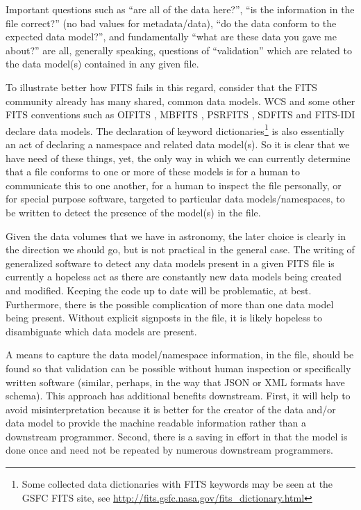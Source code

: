 \documentclass[final,authoryear,5p,times,twocolumn]{elsarticle}
\begin{document}
Important questions such as ``are all of the data here?'', ``is the
information in the file correct?'' (no bad values for metadata/data),
``do the data conform to the expected data model?'', and fundamentally
``what are these data you gave me about?'' are all, generally speaking,
questions of ``validation'' which are related to the data model(s)
contained in any given file.


To illustrate better how FITS fails in this regard, consider that the
FITS community already has many shared, common data models. WCS and
some other FITS conventions such as OIFITS
\citep{2006SPIE.6268E.106T}, MBFITS \citep{2006A&A...454L..25M},
PSRFITS \citep{2004PASA...21..302H},
SDFITS \citep{2000ASPC..216..243G} and FITS-IDI \citep{2011AIPS114}
declare data models. The declaration of keyword
dictionaries\footnote{Some collected data dictionaries with FITS
keywords may be seen at the GSFC FITS site, see
\url{http://fits.gsfc.nasa.gov/fits\_dictionary.html}} is also essentially
an act of declaring a namespace and related data model(s). So it is
clear that we have need of these things, yet, the only way in which we
can currently determine that a file conforms to one or more of these
models is for a human to communicate this to one another, for a human
to inspect the file personally, or for special purpose software,
targeted to particular data models/namespaces, to be written to detect
the presence of the model(s) in the file.


Given the data volumes that we have in astronomy, the later choice is
clearly in the direction we should go, but is not practical in the
general case. The writing of generalized software to detect any data
models present in a given FITS file is currently a hopeless act as
there are constantly new data models being created and
modified. Keeping the code up to date will be problematic, at
best. Furthermore, there is the possible complication of more than one
data model being present. Without explicit signposts in the file, it
is likely hopeless to disambiguate which data models are present.


A means to capture the data model/namespace information, in the file,
should be found so that validation can be possible without human
inspection or specifically written software (similar, perhaps, in the
way that JSON or XML formats have schema). This approach has
additional benefits downstream. First, it will help to avoid
misinterpretation because it is better for the creator of the data
and/or data model to provide the machine readable information rather
than a downstream programmer. Second, there is a saving in effort
in that the model is done once and need not be repeated by numerous
downstream programmers.
\end{document}
